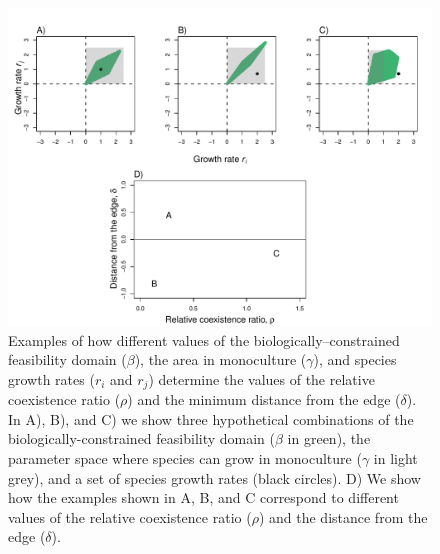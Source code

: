\begin{refsection}
\begin{figure}[H]
  \centerline{\includegraphics[width=1.1\textwidth]{figures/chapter3_fig2.pdf}}
  \caption[Examples of how different values of the biologically--constrained feasibility domain ($\beta$), the area in monoculture ($\gamma$), and species growth rates ($r_i$ and $r_j$) determine the values of the relative coexistence ratio ($\rho$) and the minimum distance from the edge ($\delta$).]{Examples of how different values of the biologically--constrained feasibility domain ($\beta$), the area in monoculture ($\gamma$), and species growth rates ($r_i$ and $r_j$) determine the values of the relative coexistence ratio ($\rho$) and the minimum distance from the edge ($\delta$). In A), B), and C) we show three hypothetical combinations of the biologically-constrained feasibility domain ($\beta$ in green), the parameter space where species can grow in monoculture ($\gamma$ in light grey), and a set of species growth rates (black circles). D) We show how the examples shown in A, B, and C correspond to different values of the relative coexistence ratio ($\rho$) and the distance from the edge ($\delta$).  }
  \label{fig:rho_delta}
\end{figure}



\end{refsection}

